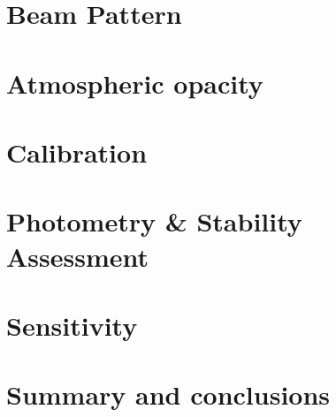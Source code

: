\documentclass[traditionalabstract]{aa}
\begin{document}
\section{Beam Pattern}
\label{se:beam}


\section{Atmospheric opacity}
\label{se:opacity}


\section{Calibration}
\label{se:calibration}



\section{Photometry \& Stability Assessment}
\label{se:photometry}


\section{Sensitivity}
\label{se:sensitivity}



\section{Summary and conclusions}
\label{se:summary}

\end{document}
